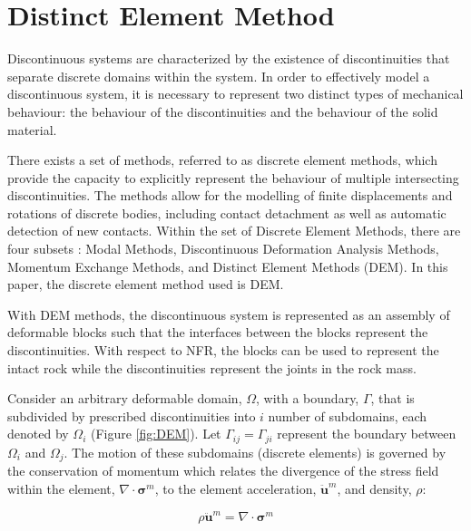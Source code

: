 \section{Distinct Element Method}

Discontinuous systems are characterized by the existence of discontinuities that separate discrete domains within the system. In order to effectively model a discontinuous system, it is necessary to represent two distinct types of mechanical behaviour: the behaviour of the discontinuities and the behaviour of the solid material.

There exists a set of methods, referred to as discrete element methods, which provide the capacity to explicitly represent the behaviour of multiple intersecting discontinuities. The methods allow for the modelling of finite displacements and rotations of discrete bodies, including contact detachment as well as automatic detection of new contacts. Within the set of Discrete Element Methods, there are four subsets \citep{CUNDALL_1992}: Modal Methods, Discontinuous Deformation Analysis Methods, Momentum Exchange Methods, and Distinct Element Methods (DEM). In this paper, the discrete element method used is DEM.

With DEM methods, the discontinuous system is represented as an assembly of deformable blocks such that the interfaces between the blocks represent the discontinuities. With respect to NFR, the blocks can be used to represent the intact rock while the discontinuities represent the joints in the rock mass. 

Consider an arbitrary deformable domain, $\Omega$, with a boundary, $\Gamma$, that is subdivided by prescribed discontinuities into $i$ number of subdomains, each denoted by $\Omega_i$ (Figure \ref{fig:DEM}). Let $\Gamma_{ij}=\Gamma_{ji}$ represent the boundary between $\Omega_i$ and $\Omega_j$. The motion of these subdomains (discrete elements) is governed by the conservation of momentum which relates the divergence of the stress field within the element, $\nabla\cdot\boldsymbol{\sigma}^m$, to the element acceleration, $\ddot{\mathbf{u}}^m$, and density, $\rho$:

\begin{equation}
\rho \ddot{\mathbf{u}}^m=\nabla\cdot\boldsymbol{\sigma}^m
\label{eqn:cauchy}
\end{equation}

